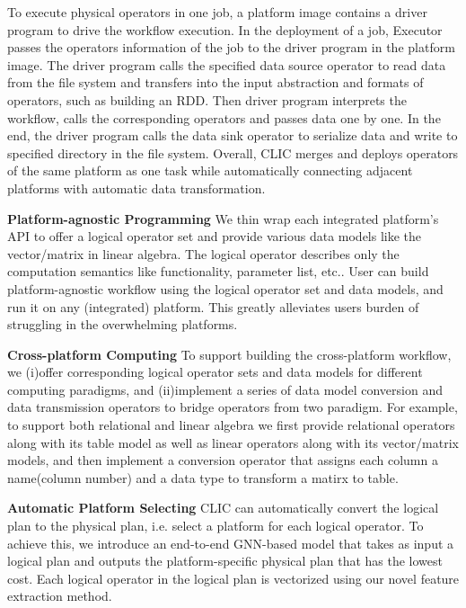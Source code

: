 To execute physical operators in one job, a platform image contains a driver program to drive the workflow execution. 
In the deployment of a job, Executor passes the operators information of the job to the driver program in the platform image. 
The driver program calls the specified data source operator to read data from the file system and transfers into the input abstraction and formats of operators, such as building an RDD. Then driver program interprets the workflow, calls the corresponding operators and passes data one by one. In the end, the driver program calls the data sink operator to serialize data and write to specified directory in the file system.
Overall, CLIC merges and deploys operators of the same platform as one task while automatically connecting adjacent platforms with automatic data transformation. 





\iffalse
\textbf{Platform-agnostic Programming}   We thin wrap each integrated platform's API to offer a logical operator set and provide various data models like the vector/matrix in linear algebra. The logical operator describes only the computation semantics like functionality, parameter list, etc.. User can build platform-agnostic workflow using the logical operator set and data models, and run it on any (integrated) platform. This greatly alleviates users burden of struggling in the overwhelming platforms.

\textbf{Cross-platform Computing}        To support building the cross-platform workflow, we (i)offer corresponding logical operator sets and data models for different computing paradigms, and (ii)implement a series of data model conversion and data transmission operators to bridge operators from two paradigm. For example, to support both relational and linear algebra we first provide relational operators along with its table model as well as linear operators along with its vector/matrix models, and then implement a conversion operator that assigns each column a name(column number) and a data type to transform a matirx to table.

\textbf{Automatic Platform Selecting}    CLIC can automatically convert the logical plan to the physical plan, i.e. select a platform for each logical operator. To achieve this, we introduce an end-to-end GNN-based model that takes as input a logical plan and outputs the platform-specific physical plan that has the lowest cost. Each logical operator in the logical plan is vectorized using our novel feature extraction method.


